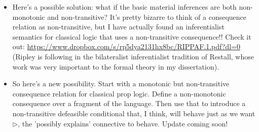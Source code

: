 \documentclass{article}
\begin{document}
\begin{itemize}
\item Here's a possible solution: what if the basic material inferences are both non-monotonic and non-transitive? It's pretty bizarre to think of a consequence relation as non-transitive, but I have actually found an inferentialist semantics for classical logic that uses a non-transitive consequence!! Check it out: \url{https://www.dropbox.com/s/rp5dya2131hx8bc/RIPPAF.1.pdf?dl=0} (Ripley is following in the bilateralist inferentialist tradition of Restall, whose work was very important to the formal theory in my dissertation). 

\item So here's a new possibility. Start with a monotonic but non-transitive consequence relation for classical prop logic. Define a non-monotonic consequence over a fragment of the language. Then use that to introduce a non-transitive defeasible conditional that, I think, will behave just as we want $\rhd$, the 'possibly explains' connective to behave. Update coming soon!




\end{itemize}
\end{document}
